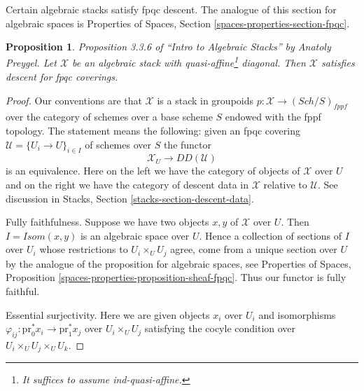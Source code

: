 \documentclass{stacks-project}
\newenvironment{reference}{\comment}{\endcomment}
\theoremstyle{plain}
\newtheorem{proposition}[subsection]{Proposition}
\theoremstyle{definition}
\theoremstyle{remark}
\numberwithin{equation}{subsection}
\def\Sch{\mathit{Sch}}
\begin{document}
\noindent
Certain algebraic stacks satisfy fpqc descent.
The analogue of this section for algebraic spaces
is Properties of Spaces, Section \ref{spaces-properties-section-fpqc}.


\begin{proposition}
\label{proposition-stack-fpqc}
\begin{reference}
Proposition 3.3.6 of ``Intro to Algebraic Stacks'' by
Anatoly Preygel.
\end{reference}
Let $\mathcal{X}$ be an algebraic stack with quasi-affine\footnote{It suffices
to assume ind-quasi-affine.} diagonal. Then
$\mathcal{X}$ satisfies descent for fpqc coverings.
\end{proposition}

\begin{proof}
Our conventions are that $\mathcal{X}$ is a stack
in groupoids $p : \mathcal{X} \to (\Sch/S)_{fppf}$
over the category of schemes over a base scheme $S$ endowed
with the fppf topology. The statement means the following:
given an fpqc covering $\mathcal{U} = \{U_i \to U\}_{i \in I}$
of schemes over $S$ the functor
$$
\mathcal{X}_U \longrightarrow DD(\mathcal{U})
$$
is an equivalence. Here on the left we have the category
of objects of $\mathcal{X}$ over $U$ and on the right we have
the category of descent data in $\mathcal{X}$ relative to $\mathcal{U}$.
See discussion in Stacks, Section \ref{stacks-section-descent-data}.

\medskip\noindent
Fully faithfulness. Suppose we have two objects $x, y$ of $\mathcal{X}$
over $U$. Then $I = \mathit{Isom}(x, y)$ is an algebraic space over $U$.
Hence a collection of sections of $I$ over $U_i$ whose restrictions
to $U_i \times_U U_j$ agree, come from a unique section over $U$ by
the analogue of the proposition for algebraic spaces, see
Properties of Spaces, Proposition
\ref{spaces-properties-proposition-sheaf-fpqc}.
Thus our functor is fully faithful.

\medskip\noindent
Essential surjectivity. Here we are given objects
$x_i$ over $U_i$ and isomorphisms
$\varphi_{ij} : \text{pr}_0^*x_i \to \text{pr}_1^*x_j$
over $U_i \times_U U_j$ satisfying the cocyle condition
over $U_i \times_U U_j \times_U U_k$.


\end{proof}
\end{document}
